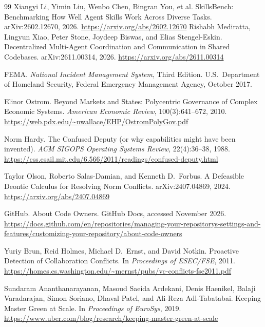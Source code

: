 \documentclass[11pt,a4paper]{article}
\theoremstyle{definition}
\theoremstyle{plain}
\begin{document}
\begin{thebibliography}{99}
Xiangyi Li, Yimin Liu, Wenbo Chen, Bingran You, et al.
\newblock SkillsBench: Benchmarking How Well Agent Skills Work Across Diverse Tasks.
\newblock arXiv:2602.12670, 2026.
\newblock \url{https://arxiv.org/abs/2602.12670}
Rishabh Mediratta, Lingyun Xiao, Peter Stone, Joydeep Biswas, and Elias Stengel-Eskin.
\newblock Decentralized Multi-Agent Coordination and Communication in Shared Codebases.
\newblock arXiv:2611.00314, 2026. \url{https://arxiv.org/abs/2611.00314}

FEMA.
\newblock \textit{National Incident Management System}, Third Edition.
\newblock U.S.\ Department of Homeland Security, Federal Emergency Management Agency, October 2017.

Elinor Ostrom.
\newblock Beyond Markets and States: Polycentric Governance of Complex Economic Systems.
\newblock \textit{American Economic Review}, 100(3):641--672, 2010.
\newblock \url{https://web.pdx.edu/~nwallace/EHP/OstromPolyGov.pdf}

Norm Hardy.
\newblock The Confused Deputy (or why capabilities might have been invented).
\newblock \textit{ACM SIGOPS Operating Systems Review}, 22(4):36--38, 1988.
\newblock \url{https://css.csail.mit.edu/6.566/2011/readings/confused-deputy.html}

Taylor Olson, Roberto Salas-Damian, and Kenneth D.\ Forbus.
\newblock A Defeasible Deontic Calculus for Resolving Norm Conflicts.
\newblock arXiv:2407.04869, 2024. \url{https://arxiv.org/abs/2407.04869}

GitHub.
\newblock About Code Owners.
\newblock GitHub Docs, accessed November 2026.
\newblock \url{https://docs.github.com/en/repositories/managing-your-repositorys-settings-and-features/customizing-your-repository/about-code-owners}

Yuriy Brun, Reid Holmes, Michael D.\ Ernst, and David Notkin.
\newblock Proactive Detection of Collaboration Conflicts.
\newblock In \textit{Proceedings of ESEC/FSE}, 2011.
\newblock \url{https://homes.cs.washington.edu/~mernst/pubs/vc-conflicts-fse2011.pdf}

Sundaram Ananthanarayanan, Masoud Saeida Ardekani, Denis Haenikel, Balaji Varadarajan, Simon Soriano, Dhaval Patel, and Ali-Reza Adl-Tabatabai.
\newblock Keeping Master Green at Scale.
\newblock In \textit{Proceedings of EuroSys}, 2019.
\newblock \url{https://www.uber.com/blog/research/keeping-master-green-at-scale}


\end{thebibliography}
\end{document}
